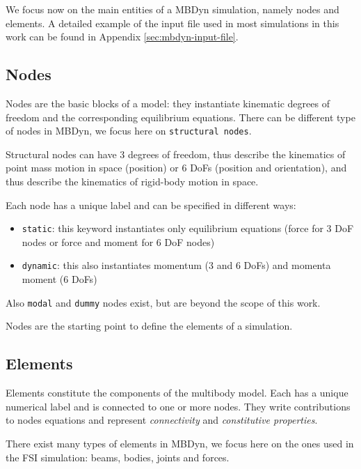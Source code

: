 We focus now on the main entities of a MBDyn simulation, namely nodes and elements. A detailed example of the input file used in most simulations in this work can be found in Appendix \ref{sec:mbdyn-input-file}.


\subsection{Nodes}
\label{sec:mbd-node}

Nodes are the basic blocks of a model: they instantiate kinematic degrees of freedom and the corresponding equilibrium equations. There can be different type of nodes in MBDyn, we focus here on \texttt{structural nodes}.

Structural nodes can have 3 degrees of freedom, thus describe the kinematics of point mass motion in space  (position) or 6 DoFs (position and orientation), and thus describe the kinematics of rigid-body motion in space.

Each node has a unique label and can be specified in different ways:

\begin{itemize}
	\item \texttt{static}: this keyword instantiates only equilibrium equations (force for 3 DoF nodes or force and moment for 6 DoF nodes)
	\item \texttt{dynamic}: this also instantiates momentum (3 and 6 DoFs) and momenta moment (6 DoFs)
\end{itemize}

Also \texttt{modal} and \texttt{dummy} nodes exist, but are beyond the scope of this work.

Nodes are the starting point to define the elements of a simulation.


\subsection{Elements}
\label{sec:mbd-elem}

Elements constitute the components of the multibody model. Each has a unique numerical label and is connected to one or more nodes. They write contributions to nodes equations and represent \textit{connectivity} and \textit{constitutive properties}.


There exist many types of elements in MBDyn, we focus here on the ones used in the FSI simulation: beams, bodies, joints and forces.



